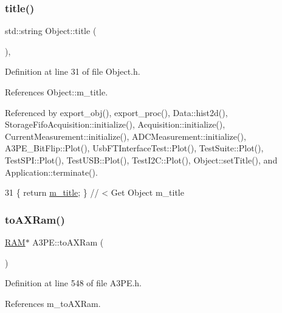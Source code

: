 \subsubsection{\texorpdfstring{title()}{title()}}
{\footnotesize\ttfamily std\+::string Object\+::title (\begin{DoxyParamCaption}{ }\end{DoxyParamCaption})\hspace{0.3cm}{\ttfamily [inline]}, {\ttfamily [inherited]}}



Definition at line 31 of file Object.\+h.



References Object\+::m\+\_\+title.



Referenced by export\+\_\+obj(), export\+\_\+proc(), Data\+::hist2d(), Storage\+Fifo\+Acquisition\+::initialize(), Acquisition\+::initialize(), Current\+Measurement\+::initialize(), A\+D\+C\+Measurement\+::initialize(), A3\+P\+E\+\_\+\+Bit\+Flip\+::\+Plot(), Usb\+F\+T\+Interface\+Test\+::\+Plot(), Test\+Suite\+::\+Plot(), Test\+S\+P\+I\+::\+Plot(), Test\+U\+S\+B\+::\+Plot(), Test\+I2\+C\+::\+Plot(), Object\+::set\+Title(), and Application\+::terminate().


\begin{DoxyCode}
31 \{ \textcolor{keywordflow}{return} \hyperlink{classObject_affbeea1953eb5163573b92fad8f75727}{m\_title};      \} \textcolor{comment}{// < Get Object m\_title}
\end{DoxyCode}
\mbox{\label{classA3PE_a16b16ac12705b9dd93d70fa172deb584}} 
\subsubsection{\texorpdfstring{to\+A\+X\+Ram()}{toAXRam()}}
{\footnotesize\ttfamily \hyperlink{classRAM}{R\+AM}$\ast$ A3\+P\+E\+::to\+A\+X\+Ram (\begin{DoxyParamCaption}{ }\end{DoxyParamCaption})\hspace{0.3cm}{\ttfamily [inline]}}



Definition at line 548 of file A3\+P\+E.\+h.



References m\+\_\+to\+A\+X\+Ram.



